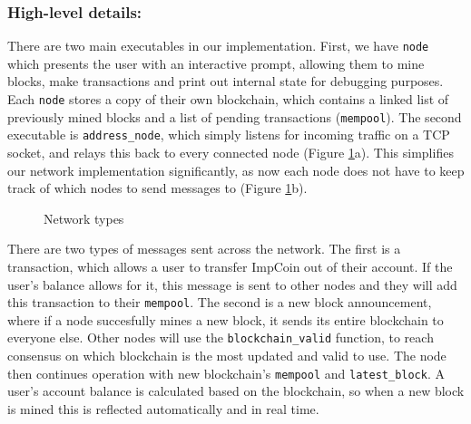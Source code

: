 \documentclass[a4paper]{article}
\begin{document}
\subsubsection{High-level details:}

There are two main executables in our implementation. First, we have \verb|node| which presents the user with an interactive prompt, allowing them to mine blocks, make transactions and print out internal state for debugging purposes. Each \verb|node| stores a copy of their own blockchain, which contains a linked list of previously mined blocks and a list of pending transactions (\verb|mempool|). The second executable is \verb|address_node|, which simply listens for incoming traffic on a TCP socket, and relays this back to every connected node (Figure \ref{fig:network-types}a). This simplifies our network implementation significantly, as now each node does not have to keep track of which nodes to send messages to (Figure \ref{fig:network-types}b).

\begin{figure}[htp]
    \centering
    \qquad
    \caption{Network types}
    \label{fig:network-types}
\end{figure}

There are two types of messages sent across the network. The first is a transaction, which allows a user to transfer ImpCoin out of their account. If the user's balance allows for it, this message is sent to other nodes and they will add this transaction to their \verb|mempool|. The second is a new block announcement, where if a node succesfully mines a new block, it sends its entire blockchain to everyone else. Other nodes will use the \verb|blockchain_valid| function, to reach consensus on which blockchain is the most updated and valid to use. The node then continues operation with new blockchain's \verb|mempool| and \verb|latest_block|. A user's account balance is calculated based on the blockchain, so when a new block is mined this is reflected automatically and in real time.
\end{document}
